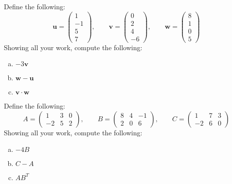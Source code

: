 \documentclass[11pt,letterpaper]{article}
\begin{document}

 Define the following:
	\[
	\mathbf{u}= \begin{pmatrix} 1 \\ -1 \\ 5 \\ 7 \end{pmatrix}, \qquad
	\mathbf{v}= \begin{pmatrix} 0 \\ 2 \\ 4 \\ -6 \end{pmatrix}, \qquad
	\mathbf{w}= \begin{pmatrix} 8 \\ 1 \\ 0 \\ 5 \end{pmatrix}
	\]
Showing all your work, compute the following:
	\begin{enumerate}[(a)]
	\item $-3\mathbf{v}$
	\item $\mathbf{w} - \mathbf{u}$
	\item $\mathbf{v} \cdot \mathbf{w}$
	\end{enumerate}



\newpage



 Define the following:
	\[
	A= \begin{pmatrix} 1 & 3 & 0 \\ -2 & 5 & 2 \end{pmatrix}, \qquad
	B= \begin{pmatrix} 8 & 4 & -1 \\ 2 & 0 & 6 \end{pmatrix}, \qquad
	C= \begin{pmatrix} 1 & 7 & 3 \\ -2 & 6 & 0 \end{pmatrix}
	\]
Showing all your work, compute the following:
	\begin{enumerate}[(a)]
	\item $-4B$
	\item $C - A$
	\item $AB^T$
	\end{enumerate}



\newpage
\end{document}
